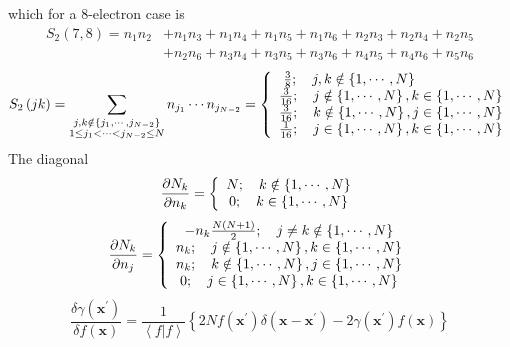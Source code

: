 \documentclass[aps,preprint]{revtex4}%
\begin{document}
which for a $8$-electron case is
\begin{align}
S_{2}\left(  7,8\right)  =n_{1}n_{2}  &  +n_{1}n_{3}+n_{1}n_{4}+n_{1}%
n_{5}+n_{1}n_{6}+n_{2}n_{3}+n_{2}n_{4}+n_{2}n_{5}\\
&  +n_{2}n_{6}+n_{3}n_{4}+n_{3}n_{5}+n_{3}n_{6}+n_{4}n_{5}+n_{4}n_{6}%
+n_{5}n_{6}%
\end{align}%
\begin{equation}
S_{2}\left(  jk\right)  =\sum_{\substack{j,k\notin\left\{  j_{1}%
,\cdots,j_{N-2}\right\}  \\1\leq j_{1}<\cdots<j_{N-2}\leq N}}n_{j_{1}}\cdots
n_{j_{N-2}}=\left\{
\begin{array}
[c]{c}%
\frac{3}{8};\quad j,k\notin\left\{  1,\cdots,N\right\}  \qquad\qquad\qquad\\
\frac{3}{16};\quad j\notin\left\{  1,\cdots,N\right\}  ,k\in\left\{
1,\cdots,N\right\} \\
\frac{3}{16};\quad k\notin\left\{  1,\cdots,N\right\}  ,j\in\left\{
1,\cdots,N\right\} \\
\frac{1}{16};\quad j\in\left\{  1,\cdots,N\right\}  ,k\in\left\{
1,\cdots,N\right\}
\end{array}
\right.
\end{equation}
The diagonal
\begin{equation}
\frac{\partial N_{k}}{\partial n_{k}}=\left\{
\begin{array}
[c]{c}%
N;\quad k\notin\left\{  1,\cdots,N\right\} \\
0;\quad k\in\left\{  1,\cdots,N\right\}
\end{array}
\right.
\end{equation}%
\begin{equation}
\frac{\partial N_{k}}{\partial n_{j}}=\left\{
\begin{array}
[c]{c}%
-n_{k}\frac{N\left(  N+1\right)  }{2};\quad j\neq k\notin\left\{
1,\cdots,N\right\} \\
n_{k};\quad j\notin\left\{  1,\cdots,N\right\}  ,k\in\left\{  1,\cdots
,N\right\} \\
n_{k};\quad k\notin\left\{  1,\cdots,N\right\}  ,j\in\left\{  1,\cdots
,N\right\} \\
0;\quad j\in\left\{  1,\cdots,N\right\}  ,k\in\left\{  1,\cdots,N\right\}
\end{array}
\right.
\end{equation}%
\[
\frac{\delta\gamma\left(  \boldsymbol{x}^{\prime}\right)  }{\delta f\left(
\boldsymbol{x}\right)  }=\frac{1}{\left\langle f|f\right\rangle }\left\{
2Nf\left(  \boldsymbol{x}^{\prime}\right)  \delta\left(  \boldsymbol{x-x}%
^{\prime}\right)  -2\gamma\left(  \boldsymbol{x}^{\prime}\right)  f\left(
\boldsymbol{x}\right)  \right\}
\]%
\end{document}

